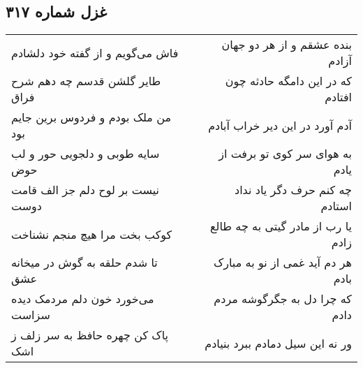 \begin{center}
\section*{غزل شماره ۳۱۷}
\label{sec:sh317}
\begin{longtable}{l p{0.5cm} r}
فاش می‌گویم و از گفته خود دلشادم
&&
بنده عشقم و از هر دو جهان آزادم
\\
طایر گلشن قدسم چه دهم شرح فراق
&&
که در این دامگه حادثه چون افتادم
\\
من ملک بودم و فردوس برین جایم بود
&&
آدم آورد در این دیر خراب آبادم
\\
سایه طوبی و دلجویی حور و لب حوض
&&
به هوای سر کوی تو برفت از یادم
\\
نیست بر لوح دلم جز الف قامت دوست
&&
چه کنم حرف دگر یاد نداد استادم
\\
کوکب بخت مرا هیچ منجم نشناخت
&&
یا رب از مادر گیتی به چه طالع زادم
\\
تا شدم حلقه به گوش در میخانه عشق
&&
هر دم آید غمی از نو به مبارک بادم
\\
می‌خورد خون دلم مردمک دیده سزاست
&&
که چرا دل به جگرگوشه مردم دادم
\\
پاک کن چهره حافظ به سر زلف ز اشک
&&
ور نه این سیل دمادم ببرد بنیادم
\\
\end{longtable}
\end{center}
